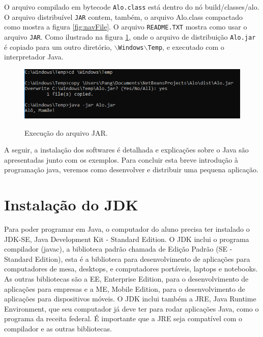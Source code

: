 \documentclass[
	12pt,				%
	twoside,			%
	a4paper,			%
	english,			%
	french,				%
	spanish,			%
	brazil				%
	]{abntex2}
\begin{document}
O arquivo compilado em bytecode \texttt{Alo.class} está dentro do nó build/classes/alo. O arquivo distribuível \texttt{JAR} contem, também, o arquivo Alo.class compactado como mostra a figura \ref{fig:navFile}. O arquivo \texttt{README.TXT} mostra como usar o arquivo \texttt{JAR}. Como ilustrado na figura \ref{fig:execJar}, onde o arquivo de distribuição \texttt{Alo.jar} é copiado para um outro diretório, \texttt{$\backslash$Windows$\backslash$Temp}, e executado com o interpretador Java.

\begin{figure}[h]
\begin{center}
\includegraphics[scale=0.4]{execJar.png} 
\caption{Execução do arquivo JAR.}
\label{fig:execJar}
\end{center}
\end{figure}

A seguir, a instalação dos softwares é detalhada e explicações sobre o Java são apresentadas junto com os exemplos. Para concluir esta breve introdução à programação java, veremos como desenvolver e distribuir uma pequena aplicação.


\chapter{Instalação do JDK} \label{part:inst}

Para poder programar em Java, o computador do aluno precisa ter instalado o JDK-SE, Java Development Kit - Standard Edition. O JDK inclui o programa compilador (javac), a biblioteca padrão chamada de Edição Padrão (SE - Standard Edition), esta é a biblioteca para desenvolvimento de aplicações para computadores de mesa, desktops, e computadores portáveis, laptops e notebooks. As outras bibliotecas são a EE, Enterprise Edition, para o desenvolvimento de aplicações para empresas e a ME, Mobile Edition, para o desenvolvimento de aplicações para dispositivos móveis. O JDK inclui também a JRE, Java Runtime Environment, que seu computador já deve ter para rodar aplicações Java, como o programa da receita federal. É importante que a JRE seja compatível com o compilador e as outras bibliotecas.
\end{document}
